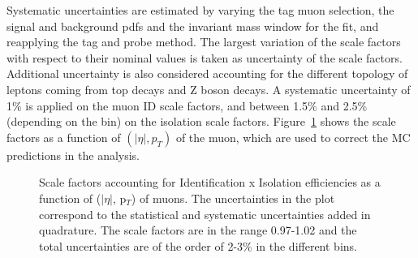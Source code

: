 Systematic uncertainties are estimated by varying the tag muon selection, the signal and background pdfs and the invariant mass window for the fit, and reapplying the tag and probe method. The largest variation of the scale factors with respect to their nominal values is taken as uncertainty of the scale factors. Additional uncertainty is also considered accounting  for the different topology of leptons coming from top decays and Z boson decays. A systematic uncertainty of 1$\%$ is applied on the muon ID scale factors, and between 1.5$\%$ and 2.5$\%$ (depending on the bin) on the isolation scale factors.
Figure~\ref{fig:topSFmu1} shows the scale factors as a function of $(|\eta|,p_T)$ of the muon, which are used to correct the MC predictions in the analysis.

\begin{figure}[htbp!]
  \begin{center}
  \end{center}
   \caption{Scale factors accounting for Identification x Isolation efficiencies as a function of ($|\eta|$, p$_T$) of muons. The uncertainties in the plot correspond to the  statistical and systematic uncertainties added in quadrature. The scale factors are in the range 0.97-1.02 and the total uncertainties are of the order of 2-3$\%$ in the different bins.}
  \label{fig:topSFmu1}
\end{figure}






